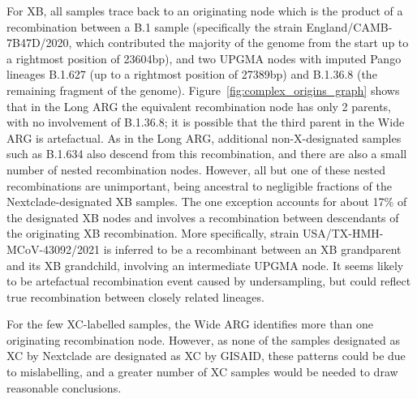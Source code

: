 \documentclass{article}
\begin{document}
For XB, all samples trace back to an originating node which is the product of a
recombination between a B.1 sample (specifically the strain
England/CAMB-7B47D/2020, which contributed the majority of
the genome from the start up to a rightmost position of 23604bp), and two
UPGMA nodes with imputed Pango lineages B.1.627 (up to a rightmost position of
27389bp) and B.1.36.8 (the remaining fragment of the genome). Figure~\ref{fig:complex_origins_graph}
shows that in the Long ARG the equivalent recombination node has only 2 parents,
with no involvement of  B.1.36.8; it is possible that the third parent in
the Wide ARG is artefactual. As in the Long ARG, additional
non-X-designated samples such as B.1.634 also descend from this recombination,
and there are also a small number of nested recombination nodes. However, all but
one of these nested recombinations are unimportant, being ancestral to negligible fractions
of the Nextclade-designated XB samples. The one exception accounts for about 17\% of the
designated XB nodes and involves a recombination between descendants of the
originating XB recombination. More specifically, strain
USA/TX-HMH-MCoV-43092/2021 is inferred to be a recombinant
between an XB grandparent and its XB grandchild, involving an intermediate UPGMA node.
It seems likely to be artefactual recombination event
caused by undersampling, but could reflect true 
recombination between closely related lineages.

For the few XC-labelled samples, the Wide ARG identifies more than one
originating recombination node. However, as none of the samples designated as
XC by Nextclade are designated as XC by GISAID, these patterns could be due to
mislabelling, and a greater number of XC samples would be needed to draw reasonable
conclusions.


\end{document}
